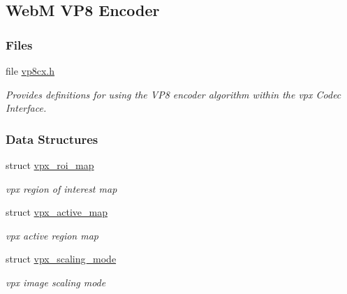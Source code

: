 \hypertarget{group__vp8__encoder}{\subsection{Web\-M V\-P8 Encoder}
\label{group__vp8__encoder}
}
\subsubsection*{Files}
\begin{DoxyCompactItemize}
\item 
file \hyperlink{vp8cx_8h}{vp8cx.\-h}
\begin{DoxyCompactList}\small\item\em Provides definitions for using the V\-P8 encoder algorithm within the vpx Codec Interface. \end{DoxyCompactList}\end{DoxyCompactItemize}
\subsubsection*{Data Structures}
\begin{DoxyCompactItemize}
\item 
struct \hyperlink{structvpx__roi__map}{vpx\-\_\-roi\-\_\-map}
\begin{DoxyCompactList}\small\item\em vpx region of interest map \end{DoxyCompactList}\item 
struct \hyperlink{structvpx__active__map}{vpx\-\_\-active\-\_\-map}
\begin{DoxyCompactList}\small\item\em vpx active region map \end{DoxyCompactList}\item 
struct \hyperlink{structvpx__scaling__mode}{vpx\-\_\-scaling\-\_\-mode}
\begin{DoxyCompactList}\small\item\em vpx image scaling mode \end{DoxyCompactList}\end{DoxyCompactItemize}
